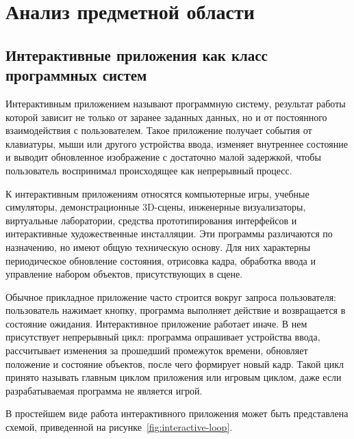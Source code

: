 \section{Анализ предметной области}

\subsection{Интерактивные приложения как класс программных систем}

Интерактивным приложением называют программную систему, результат
работы которой зависит не только от заранее заданных данных, но и от
постоянного взаимодействия с пользователем. Такое приложение получает
события от клавиатуры, мыши или другого устройства ввода, изменяет
внутреннее состояние и выводит обновленное изображение с достаточно малой
задержкой, чтобы пользователь воспринимал происходящее как непрерывный
процесс.

К интерактивным приложениям относятся компьютерные игры, учебные
симуляторы, демонстрационные 3D-сцены, инженерные визуализаторы,
виртуальные лаборатории, средства прототипирования интерфейсов и
интерактивные художественные инсталляции. Эти программы различаются по
назначению, но имеют общую техническую основу. Для них характерны
периодическое обновление состояния, отрисовка кадра, обработка ввода и
управление набором объектов, присутствующих в сцене.

Обычное прикладное приложение часто строится вокруг запроса
пользователя: пользователь нажимает кнопку, программа выполняет действие
и возвращается в состояние ожидания. Интерактивное приложение работает
иначе. В нем присутствует непрерывный цикл: программа опрашивает
устройства ввода, рассчитывает изменения за прошедший промежуток времени,
обновляет положение и состояние объектов, после чего формирует новый кадр.
Такой цикл принято называть главным циклом приложения или игровым
циклом, даже если разрабатываемая программа не является игрой.

В простейшем виде работа интерактивного приложения может быть
представлена схемой, приведенной на рисунке~\ref{fig:interactive-loop}.

